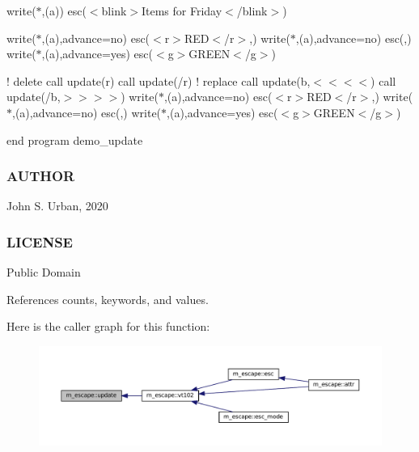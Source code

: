 write($\ast$,\textquotesingle{}(a)\textquotesingle{}) esc(\textquotesingle{}$<$blink$>$Items for Friday$<$/blink$>$\textquotesingle{})

write($\ast$,\textquotesingle{}(a)\textquotesingle{},advance=\textquotesingle{}no\textquotesingle{}) esc(\textquotesingle{}$<$r$>$R\+ED$<$/r$>$,\textquotesingle{}) write($\ast$,\textquotesingle{}(a)\textquotesingle{},advance=\textquotesingle{}no\textquotesingle{}) esc(,\textquotesingle{}) write($\ast$,\textquotesingle{}(a)\textquotesingle{},advance=\textquotesingle{}yes\textquotesingle{}) esc(\textquotesingle{}$<$g$>$G\+R\+E\+EN$<$/g$>$\textquotesingle{})

! delete call update(\textquotesingle{}r\textquotesingle{}) call update(\textquotesingle{}/r\textquotesingle{}) ! replace call update(\textquotesingle{}b\textquotesingle{},\textquotesingle{}$<$$<$$<$$<$\textquotesingle{}) call update(\textquotesingle{}/b\textquotesingle{},\textquotesingle{}$>$$>$$>$$>$\textquotesingle{}) write($\ast$,\textquotesingle{}(a)\textquotesingle{},advance=\textquotesingle{}no\textquotesingle{}) esc(\textquotesingle{}$<$r$>$R\+ED$<$/r$>$,\textquotesingle{}) write($\ast$,\textquotesingle{}(a)\textquotesingle{},advance=\textquotesingle{}no\textquotesingle{}) esc(,\textquotesingle{}) write($\ast$,\textquotesingle{}(a)\textquotesingle{},advance=\textquotesingle{}yes\textquotesingle{}) esc(\textquotesingle{}$<$g$>$G\+R\+E\+EN$<$/g$>$\textquotesingle{})

end program demo\+\_\+update

\subsubsection*{A\+U\+T\+H\+OR}

John S. Urban, 2020

\subsubsection*{L\+I\+C\+E\+N\+SE}

Public Domain 

References counts, keywords, and values.

Here is the caller graph for this function\+:\nopagebreak
\begin{figure}[H]
\begin{center}
\leavevmode
\includegraphics[width=350pt]{namespacem__escape_a5efd612f60d281003917329484a7960c_icgraph}
\end{center}
\end{figure}
\mbox{\label{namespacem__escape_ae9d40717b2e75e90e2505d5fed6435c5}} 
